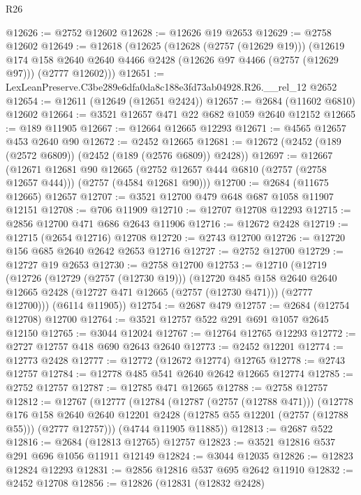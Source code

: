 \begin{lexlean}{R26}
\begin{coremodule}
@12626 := @2752 @12602
@12628 := @12626 @19 @2653
@12629 := @2758 @12602
@12649 := @12618
    (@12625
      (@12628 (@2757 (@12629 @19)))
      (@12619
        @174
        @158
        @2640
        @2640
        @4466
        @2428
        (@12626 @97 @4466 (@2757 (@12629 @97)))
        (@2777 @12602)))
@12651 := LexLeanPreserve.C3be289e6dfa0da8c188e3fd73ab04928.R26.__rel_12 @2652
@12654 := @12611 (@12649 (@12651 @2424))
@12657 := @2684 (@11602 @6810) @12602
@12664 := @3521 @12657 @471 @22 @682 @1059 @2640 @12152
@12665 := @189 @11905
@12667 := @12664 @12665 @12293
@12671 := @4565 @12657 @453 @2640 @90
@12672 := @2452 @12665
@12681 := @12672 (@2452 (@189 (@2572 @6809)) (@2452 (@189 (@2576 @6809)) @2428))
@12697 := @12667
    (@12671
      @12681
      @90
      @12665
      (@2752 @12657 @444 @6810 (@2757 (@2758 @12657 @444)))
      (@2757 (@4584 @12681 @90)))
@12700 := @2684 (@11675 @12665) @12657
@12707 := @3521 @12700 @479 @648 @687 @1058 @11907 @12151
@12708 := @706 @11909
@12710 := @12707 @12708 @12293
@12715 := @2856 @12700 @471 @686 @2643 @11906
@12716 := @12672 @2428
@12719 := @12715 (@2654 @12716) @12708
@12720 := @2743 @12700
@12726 := @12720 @156 @685 @2640 @2642 @2653 @12716
@12727 := @2752 @12700
@12729 := @12727 @19 @2653
@12730 := @2758 @12700
@12753 := @12710
    (@12719
      (@12726
        (@12729 (@2757 (@12730 @19)))
        (@12720
          @485
          @158
          @2640
          @2640
          @12665
          @2428
          (@12727 @471 @12665 (@2757 (@12730 @471)))
          (@2777 @12700)))
      (@6114 @11905))
@12754 := @2687 @479
@12757 := @2684 (@12754 @12708) @12700
@12764 := @3521 @12757 @522 @291 @691 @1057 @2645 @12150
@12765 := @3044 @12024
@12767 := @12764 @12765 @12293
@12772 := @2727 @12757 @418 @690 @2643 @2640
@12773 := @2452 @12201
@12774 := @12773 @2428
@12777 := @12772 (@12672 @12774) @12765
@12778 := @2743 @12757
@12784 := @12778 @485 @541 @2640 @2642 @12665 @12774
@12785 := @2752 @12757
@12787 := @12785 @471 @12665
@12788 := @2758 @12757
@12812 := @12767
    (@12777
      (@12784
        (@12787 (@2757 (@12788 @471)))
        (@12778
          @176
          @158
          @2640
          @2640
          @12201
          @2428
          (@12785 @55 @12201 (@2757 (@12788 @55)))
          (@2777 @12757)))
      (@4744 @11905 @11885))
@12813 := @2687 @522
@12816 := @2684 (@12813 @12765) @12757
@12823 := @3521 @12816 @537 @291 @696 @1056 @11911 @12149
@12824 := @3044 @12035
@12826 := @12823 @12824 @12293
@12831 := @2856 @12816 @537 @695 @2642 @11910
@12832 := @2452 @12708
@12856 := @12826
    (@12831
      (@12832 @2428)

\end{coremodule}
\end{lexlean}
